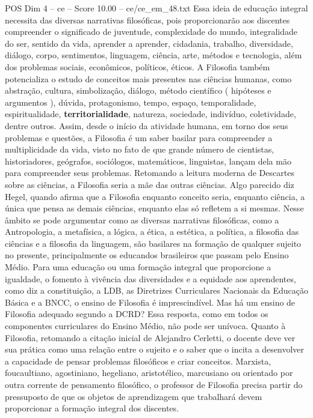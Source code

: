 \begin{textsample}{POS Dim 4 – ce – Score 10.00 – ce/ce\_em\_48.txt}
Essa ideia de educação integral necessita das diversas narrativas filosóficas, pois proporcionarão aos discentes compreender o significado de juventude, complexidade do mundo, integralidade do ser, sentido da vida, aprender a aprender, cidadania, trabalho, diversidade, diálogo, corpo, sentimentos, linguagem, ciência, arte, métodos e tecnologia, além dos problemas sociais, econômicos, políticos, éticos.
A Filosofia também potencializa o estudo de conceitos mais presentes nas ciências humanas, como abstração, cultura, simbolização, diálogo, método científico ( hipóteses e argumentos ), dúvida, protagonismo, tempo, espaço, temporalidade, espiritualidade, \textbf{territorialidade}, natureza, sociedade, indivíduo, coletividade, dentre outros.
Assim, desde o início da atividade humana, em torno dos seus problemas e questões, a Filosofia é um saber basilar para compreender a multiplicidade da vida, visto no fato de que grande número de cientistas, historiadores, geógrafos, sociólogos, matemáticos, linguistas, lançam dela mão para compreender seus problemas.
Retomando a leitura moderna de Descartes sobre as ciências, a Filosofia seria a mãe das outras ciências.
Algo parecido diz Hegel, quando afirma que a Filosofia enquanto conceito seria, enquanto ciência, a única que pensa as demais ciências, enquanto elas só refletem a si mesmas.
Nesse âmbito se pode argumentar como as diversas narrativas filosóficas, como a Antropologia, a metafísica, a lógica, a ética, a estética, a política, a filosofia das ciências e a filosofia da linguagem, são basilares na formação de qualquer sujeito no presente, principalmente os educandos brasileiros que passam pelo Ensino Médio.
Para uma educação ou uma formação integral que proporcione a igualdade, o fomento à vivência das diversidades e a equidade aos aprendentes, como diz a constituição, a LDB, as Diretrizes Curriculares Nacionais da Educação Básica e a BNCC, o ensino de Filosofia é imprescindível.
Mas há um ensino de Filosofia adequado segundo a DCRD?
Essa resposta, como em todos os componentes curriculares do Ensino Médio, não pode ser unívoca.
Quanto à Filosofia, retomando a citação inicial de Alejandro Cerletti, o docente deve ver sua prática como uma relação entre o sujeito e o saber que o incita a desenvolver a capacidade de pensar problemas filosóficos e criar conceitos.
Marxista, foucaultiano, agostiniano, hegeliano, aristotélico, marcusiano ou orientado por outra corrente de pensamento filosófico, o professor de Filosofia precisa partir do pressuposto de que os objetos de aprendizagem que trabalhará devem proporcionar a formação integral dos discentes.

\end{textsample}
